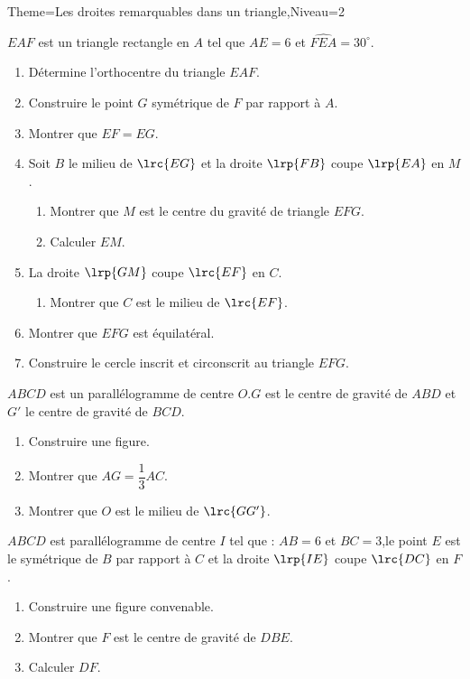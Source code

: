 \documentclass[a4paper,12pt]{article}
\begin{document}
\begin{Maquette}[Fiche]{Theme=Les droites remarquables dans un triangle,Niveau=2}
\begin{exercice}
$EAF$ est un triangle rectangle en $A$ tel que $AE=6$ et $\widehat{FEA}=30^{\circ}$.
\begin{enumerate}
\item Détermine l'orthocentre du triangle $EAF$.
\item Construire le point $G$ symétrique de $F$ par rapport à $A$.
\item Montrer que $EF=EG$.
\item Soit $B$ le milieu de $\lrc{EG}$ et la droite $\lrp{FB}$ coupe $\lrp{EA}$ en $M$.
\begin{enumerate}
\item Montrer que $M$ est le centre du gravité de triangle $EFG$.
\item Calculer $EM$.
\end{enumerate}
\item La droite $\lrp{GM}$ coupe $\lrc{EF}$ en $C$.
\begin{enumerate}
\item Montrer que $C$ est le milieu de $\lrc{EF}$.
\end{enumerate}
\item Montrer que $EFG$ est équilatéral.
\item Construire le cercle inscrit et circonscrit au triangle $EFG$.
\end{enumerate}
\end{exercice}

\begin{exercice}
$ABCD$ est un parallélogramme de centre $O$.$G$ est le centre de gravité de $ABD$ et $G'$ le centre de gravité de $BCD$.
\begin{enumerate}
\item Construire une figure.
\item Montrer que $AG=\dfrac{1}{3}AC$.
\item Montrer que $O$ est le milieu de $\lrc{GG'}$.
\end{enumerate}
\end{exercice}

\begin{exercice}
$ABCD$ est parallélogramme de centre $I$ tel que : $AB=6$  et $BC=3$,le point $E$ est le symétrique de $B$ par rapport à $C$ et la droite $\lrp{IE}$ coupe $\lrc{DC}$ en $F$.
\begin{enumerate}
\item Construire une figure convenable.
\item Montrer que $F$ est le centre de gravité de $DBE$.
\item Calculer $DF$.
\end{enumerate}
\end{exercice}


\end{Maquette}
\end{document}
